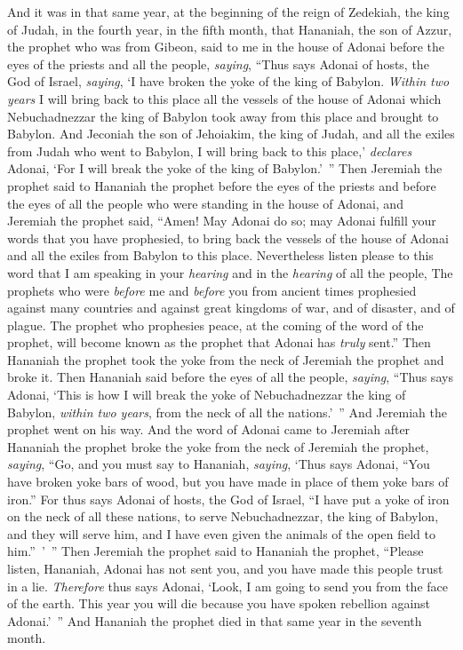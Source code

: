 \begin{biblechapter} %
 And it was in that same year, at the beginning of the reign of Zedekiah, the king of Judah, in the fourth year, in the fifth month, that Hananiah, the son of Azzur, the prophet who was from Gibeon, said to me in the house of Adonai before the eyes of the priests and all the people, \textit{saying},
\verse “Thus says Adonai of hosts, the God of Israel, \textit{saying}, ‘I have broken the yoke of the king of Babylon.
\verse \textit{Within two years} I will bring back to this place all the vessels of the house of Adonai which Nebuchadnezzar the king of Babylon took away from this place and brought to Babylon.
\verse And Jeconiah the son of Jehoiakim, the king of Judah, and all the exiles from Judah who went to Babylon, I will bring back to this place,’ \textit{declares} Adonai, ‘For I will break the yoke of the king of Babylon.’ ”
\verse Then Jeremiah the prophet said to Hananiah the prophet before the eyes of the priests and before the eyes of all the people who were standing in the house of Adonai,
\verse and Jeremiah the prophet said, “Amen! May Adonai do so; may Adonai fulfill your words that you have prophesied, to bring back the vessels of the house of Adonai and all the exiles from Babylon to this place.
\verse Nevertheless listen please to this word that I am speaking in your \textit{hearing} and in the \textit{hearing} of all the people,
\verse The prophets who were \textit{before} me and \textit{before} you from ancient times prophesied against many countries and against great kingdoms of war, and of disaster, and of plague.
\verse The prophet who prophesies peace, at the coming of the word of the prophet, will become known as the prophet that Adonai has \textit{truly} sent.”
\verse Then Hananiah the prophet took the yoke from the neck of Jeremiah the prophet and broke it.
\verse Then Hananiah said before the eyes of all the people, \textit{saying}, “Thus says Adonai, ‘This is how I will break the yoke of Nebuchadnezzar the king of Babylon, \textit{within two years}, from the neck of all the nations.’ ” And Jeremiah the prophet went on his way.
\verse And the word of Adonai came to Jeremiah after Hananiah the prophet broke the yoke from the neck of Jeremiah the prophet, \textit{saying},
\verse “Go, and you must say to Hananiah, \textit{saying}, ‘Thus says Adonai, “You have broken yoke bars of wood, but you have made in place of them yoke bars of iron.”
\verse For thus says Adonai of hosts, the God of Israel, “I have put a yoke of iron on the neck of all these nations, to serve Nebuchadnezzar, the king of Babylon, and they will serve him, and I have even given the animals of the open field to him.” ’ ”
\verse Then Jeremiah the prophet said to Hananiah the prophet, “Please listen, Hananiah, Adonai has not sent you, and you have made this people trust in a lie.
\verse \textit{Therefore} thus says Adonai, ‘Look, I am going to send you from the face of the earth. This year you will die because you have spoken rebellion against Adonai.’ ”
\verse And Hananiah the prophet died in that same year in the seventh month.
\end{biblechapter}

